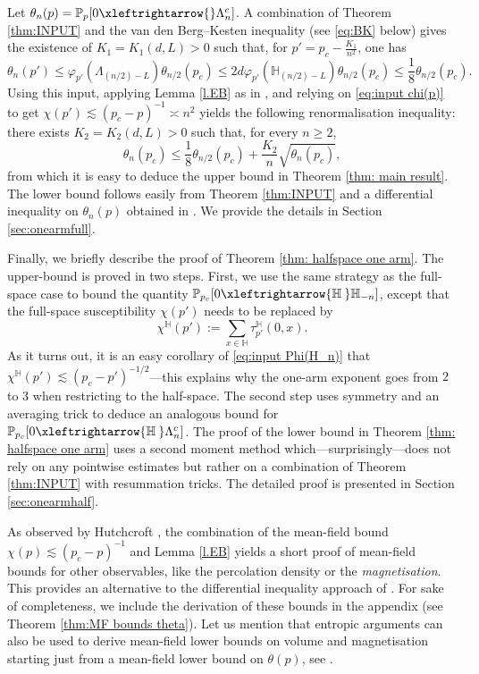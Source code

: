 \documentclass[11pt,a4paper]{article}
\numberwithin{equation}{section}
\theoremstyle{plain}
\theoremstyle{definition}
\newcommand{\connect}{\xleftrightarrow}
\newcommand{\1}{\mathbf 1}
\def\H{\mathbb{H}}
\def\P{\mathbb{P}} %
\def\bf{\bfseries}
\begin{document}
Let $\theta_n(p)=\mathbb P_{p}[0\connect{}\Lambda_n^c]$. A combination of Theorem \ref{thm:INPUT} and the van den Berg--Kesten inequality (see \eqref{eq:BK} below) gives the existence of $K_1=K_1(d,L)>0$ such that, for $p'=p_c-\frac{K_1}{n^2}$, one has
\begin{equation}
	\theta_n(p')\leq \varphi_{p'}(\Lambda_{(n/2)- L })\theta_{n/2}(p_c) \leq 2d\varphi_{p'}(\mathbb H_{(n/2)- L })\theta_{n/2}(p_c)\leq \frac{1}{8}\theta_{n/2}(p_c).
\end{equation}
Using this input, applying Lemma \ref{l.EB} as in \cite{DewanMuirhead}, and relying on \eqref{eq:input chi(p)} to get $\chi(p')\lesssim (p_c-p)^{-1}\asymp n^2$ yields the following renormalisation inequality: there exists $K_2=K_2(d,L)>0$ such that, for every $n\geq 2$,
\begin{equation}
	\theta_n(p_c)\leq \frac{1}{8}\theta_{n/2}(p_c)+\frac{K_2}{n}\sqrt{\theta_n(p_c)},
\end{equation}
from which it is easy to deduce the upper bound in Theorem \ref{thm: main result}. The lower bound follows easily from Theorem \ref{thm:INPUT} and a differential inequality on $\theta_n(p)$ obtained in \cite{DuminilTassionNewProofSharpness2016}. We provide the details in Section \ref{sec:onearmfull}.

Finally, we briefly describe the proof of Theorem \ref{thm: halfspace one arm}. The upper-bound is proved in two steps. First, we use the same strategy as the full-space case to bound the quantity $\P_{p_c}[0\connect{\mathbb H\:} \H_{-n}]$, except that the full-space susceptibility $\chi(p')$ needs to be replaced by 
\begin{equation}
	\chi^{\mathbb H}(p'):=\sum_{x\in \mathbb H}\tau^{\mathbb H}_{p'}(0,x).
\end{equation} 
As it turns out, it is an easy corollary of \eqref{eq:input Phi(H_n)} that $\chi^{\mathbb H}(p')\lesssim (p_c-p')^{-1/2}$---this explains why the one-arm exponent goes from $2$ to $3$ when restricting to the half-space. 
The second step uses symmetry and an averaging trick to deduce an analogous bound for $\P_{p_c}[0\connect{\mathbb H\:} \Lambda_n^c]$. 
The proof of the lower bound in Theorem \ref{thm: halfspace one arm} uses a second moment method which---surprisingly---does not rely on any pointwise estimates but rather on a combination of Theorem \ref{thm:INPUT} with resummation tricks. The detailed proof is presented in Section \ref{sec:onearmhalf}.

As observed by Hutchcroft \cite{hutchcroft2022derivation}, the combination of the mean-field bound $\chi(p)\lesssim (p_c-p)^{-1}$ and Lemma \ref{l.EB} yields a short proof of mean-field bounds for other observables, like the percolation density or the \emph{magnetisation}. This provides an alternative to the differential inequality approach of \cite{BarskyAizenmanCriticalExponentPercoUnderTriangle1991}. For sake of completeness, we include the derivation of these bounds in the appendix (see Theorem \ref{thm:MF bounds theta}). 
Let us mention that entropic arguments can also be used to derive mean-field lower bounds on volume and magnetisation starting just from a mean-field lower bound on $\theta(p)$, see \cite{DM_Bololean}.
\end{document}
